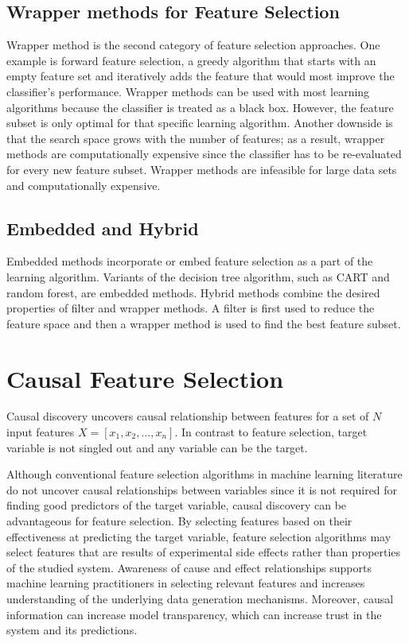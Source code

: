 \subsection{Wrapper methods for Feature Selection}
Wrapper method is the second category of feature selection approaches. One example is forward feature selection, a greedy algorithm that starts with an empty feature set and iteratively adds the feature that would most improve the classifier's performance. Wrapper methods can be used with most learning algorithms because the classifier is treated as a black box. However, the feature subset is only optimal for that specific learning algorithm. Another downside is that the search space grows with the number of features; as a result, wrapper methods are computationally expensive since the classifier has to be re-evaluated for every new feature subset. Wrapper methods are infeasible for large data sets and computationally expensive. 

\subsection{Embedded and Hybrid}
Embedded methods incorporate or embed feature selection as a part of the learning algorithm. Variants of the decision tree algorithm, such as CART and random forest, are embedded methods. Hybrid methods combine the desired properties of filter and wrapper methods. A filter is first used to reduce the feature space and then a wrapper method is used to find the best feature subset.  

\section{Causal Feature Selection} \label{CausalFSSubsection}
Causal discovery uncovers causal relationship between features for a set of \(N\) input features \(X = [x_1, x_2, ..., x_n]\). In contrast to feature selection, target variable is not singled out and any variable can be the target.  

Although conventional feature selection algorithms in machine learning literature do not uncover causal relationships between variables since it is not required for finding good predictors of the target variable, causal discovery can be advantageous for feature selection. By selecting features based on their effectiveness at predicting the target variable, feature selection algorithms may select features that are results of experimental side effects rather than properties of the studied system. Awareness of cause and effect relationships supports machine learning practitioners in selecting relevant features and increases understanding of the underlying data generation mechanisms. Moreover, causal information can increase model transparency, which can increase trust in the system and its predictions.

